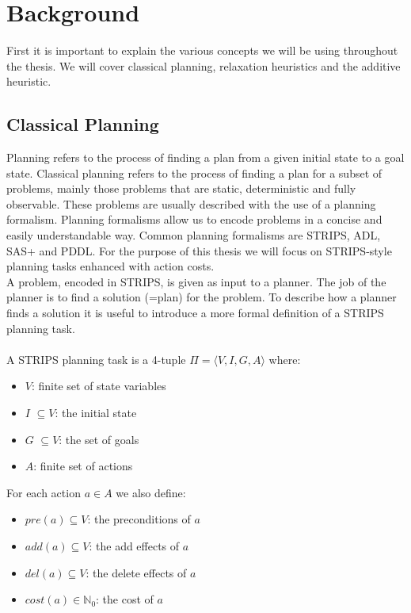 \chapter{Background}

First it is important to explain the various concepts we will be using throughout the thesis. We will cover classical planning, relaxation heuristics and the additive heuristic.

\section{Classical Planning}
\label{sec:my-label}

Planning refers to the process of finding a plan from a given initial state to a goal state. Classical planning refers to the process of finding a plan for a subset of problems, mainly those problems that are static, deterministic and fully observable. These problems are usually described with the use of a planning formalism. Planning formalisms allow us to encode problems in a concise and easily understandable way. Common planning formalisms are STRIPS, ADL, SAS+ and PDDL. For the purpose of this thesis we will focus on STRIPS-style planning tasks enhanced with action costs.  \\

A problem, encoded in STRIPS, is given as input to a planner. The job of the planner is to find a solution (=plan) for the problem. To describe how a planner finds a solution it is useful to introduce a more formal definition of a STRIPS planning task.  \\\\
A STRIPS planning task is a 4-tuple $\Pi = \langle V, I, G, A \rangle$ where:

\begin{itemize}
\setlength\itemsep{0em}
 \item $V$: finite set of state variables 
 \item $I$ $\subseteq V$: the initial state
 \item $G$ $\subseteq V$: the set of goals
 \item $A$: finite set of actions
\end{itemize}

For each action $a \in A$ we also define: 

\begin{itemize}
\setlength\itemsep{0em}
\item $pre(a) \subseteq V$: the preconditions of $a$ 
\item $add(a) \subseteq V$: the add effects of $a$ 
\item $del(a) \subseteq V$: the delete effects of $a$ 
\item $cost(a) \in \mathbb{N}_0$: the cost of $a$ 
\end{itemize}
\newpage

